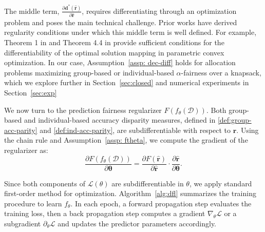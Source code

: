 \documentclass[ijoc,sglanonrev]{informs4}
\begin{document}
The middle term, $\frac{\partial \mathbf{d}^*(\hat{\mathbf{r}})}{\partial \hat{\mathbf{r}}}$, requires differentiating through an optimization problem and poses the main technical challenge. Prior works have derived regularity conditions under which this middle term is well defined. For example, Theorem 1 in \citet{amos2017optnet} and Theorem 4.4 in \citet{still2018lectures} provide sufficient conditions for the differentiability of the optimal solution mapping in parametric convex optimization. In our case, Assumption~\ref{assp: dec-diff} holds for allocation problems maximizing group-based or individual-based $\alpha$-fairness over a knapsack, which we explore further in Section~\ref{sec:closed} and numerical experiments in Section~\ref{sec:exp}

We now turn to the prediction fairness regularizer $F(f_{\theta}(\mathcal{D}))$. Both group-based and individual-based accuracy disparity measures, defined in \eqref{def:group-acc-parity} and \eqref{def:ind-acc-parity}, are subdifferentiable with respect to $\hat{\mathbf{r}}$.
Using the chain rule and Assumption~\ref{assp: ftheta}, we compute the gradient of the regularizer as:
\begin{equation} \label{eq:grad-chain-pred}
  \frac{\partial{F(f_{\theta}(\mathcal{D}))}}{\partial{\boldsymbol\theta}} = \frac{\partial{F(\hat{\mathbf{r}})}}{\partial{\hat{\mathbf{r}}}} \cdot \frac{\partial{\hat{\mathbf{r}}}}{\partial{\boldsymbol{\theta}}}.
\end{equation}

Since both components of $\mathcal{L}(\theta)$ are subdifferentiable in $\theta$, we apply standard first-order method for optimization. Algorithm~\ref{alg:dfl} summarizes the training procedure to learn $f_{\theta}$. In each epoch, a forward propagation step evaluates the training loss, then a back propagation step computes a gradient $\nabla_{\theta} \mathcal{L}$ or a subgradient $\partial_{\theta}\mathcal{L}$ and updates the predictor parameters accordingly. 
\end{document}
